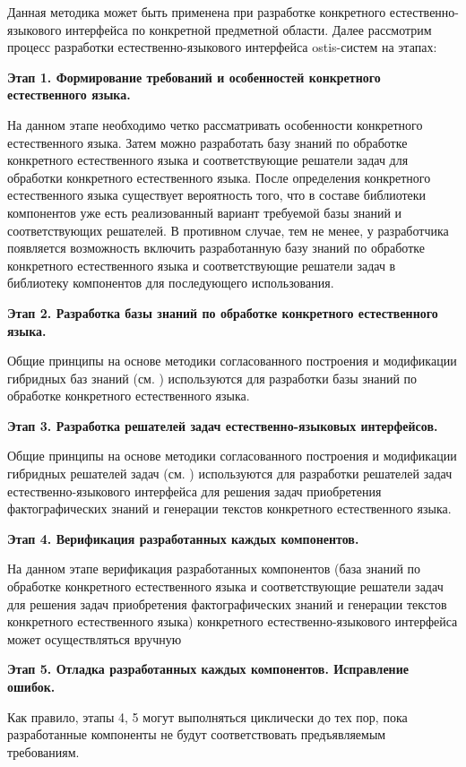 Данная методика может быть применена при разработке конкретного естественно-языкового интерфейса по конкретной предметной области. Далее рассмотрим процесс разработки естественно-языкового интерфейса ostis-систем на этапах:

\textbf{Этап 1. Формирование требований и особенностей конкретного естественного языка.}

На данном этапе необходимо четко рассматривать особенности конкретного естественного языка. Затем можно разработать базу знаний по обработке конкретного естественного языка и соответствующие решатели задач для обработки конкретного естественного языка. После определения конкретного естественного языка существует вероятность того, что в составе библиотеки компонентов уже есть реализованный вариант требуемой базы знаний и соответствующих решателей. В противном случае, тем не менее, у разработчика появляется возможность включить разработанную базу знаний по обработке конкретного естественного языка и соответствующие решатели задач в библиотеку компонентов для последующего использования.

\textbf{Этап 2. Разработка базы знаний по обработке конкретного естественного языка.}

Общие принципы на основе методики согласованного построения и модификации гибридных баз знаний (см. ) используются для разработки базы знаний по обработке конкретного естественного языка.

\textbf{Этап 3. Разработка решателей задач естественно-языковых интерфейсов.}

Общие принципы на основе методики согласованного построения и модификации гибридных решателей задач (см. ) используются для разработки решателей задач естественно-языкового интерфейса для решения задач приобретения фактографических знаний и генерации текстов конкретного естественного языка.

\textbf{Этап 4. Верификация разработанных каждых компонентов.}

На данном этапе верификация разработанных компонентов (база знаний по обработке конкретного естественного языка и соответствующие решатели задач для решения задач приобретения фактографических знаний и генерации текстов конкретного естественного языка) конкретного естественно-языкового интерфейса может осуществляться вручную

\textbf{Этап 5. Отладка разработанных каждых компонентов. Исправление ошибок.}

Как правило, этапы 4, 5 могут выполняться циклически до тех пор, пока разработанные компоненты не будут соответствовать предъявляемым требованиям.

